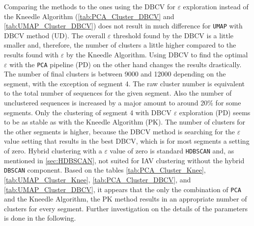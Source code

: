 Comparing the methods to the ones using the \gls{DBCV} for $\varepsilon$ exploration instead of the Kneedle Algorithm (\autoref{tab:PCA_Cluster_DBCV} and \autoref{tab:UMAP_Cluster_DBCV}) does not result in much difference for \texttt{UMAP} with \gls{DBCV} method (UD). The overall $\varepsilon$ threshold found by the \gls{DBCV} is a little smaller and, therefore, the number of clusters a little higher compared to the results found with $\varepsilon$ by the Kneedle Algorithm. Using \gls{DBCV} to find the optimal $\varepsilon$ with the \texttt{PCA} pipeline (PD) on the other hand changes the results drastically. The number of final clusters is between 9000 and 12000 depending on the segment, with the exception of segment 4. The raw cluster number is equivalent to the total number of sequences for the given segment. Also the number of unclustered sequences is increased by a major amount to around 20\% for some segments. Only the clustering of segment 4 with \gls{DBCV} $\varepsilon$ exploration (PD) seems to be as stable as with the Kneedle Algorithm (PK). The number of clusters for the other segments is higher, because the \gls{DBCV} method is searching for the $\varepsilon$ value setting that results in the best \gls{DBCV}, which is for most segments a setting of zero. Hybrid clustering with a $\varepsilon$ value of zero is standard \texttt{HDBSCAN} and, as mentioned in \autoref{sec:HDBSCAN}, not suited for \gls{IAV} clustering without the hybrid \texttt{DBSCAN} component. Based on the tables \autoref{tab:PCA_Cluster_Knee}, \autoref{tab:UMAP_Cluster_Knee}, \autoref{tab:PCA_Cluster_DBCV}, and \autoref{tab:UMAP_Cluster_DBCV}, it appears that the only the combination of \texttt{PCA} and the Kneedle Algorithm, the PK method results in an appropriate number of clusters for every segment. Further investigation on the details of the parameters is done in the following.

